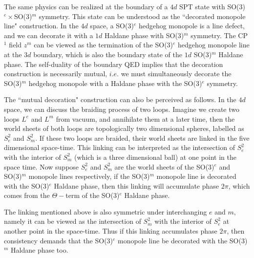 \documentclass[aps,prb,twocolumn,superscriptaddress,showpacs]{revtex4}
\begin{document}
The same physics can be realized at the boundary of a $4d$ SPT
state with SO(3)$^e \times $SO(3)$^m$ symmetry. This state can be
understood as the ``decorated monopole line" construction. In the
$4d$ space, a SO(3)$^e$ hedgehog monopole is a line defect, and we
can decorate it with a $1d$ Haldane phase with SO(3)$^m$ symmetry.
The CP$^1$ field $z^m$ can be viewed as the termination of the
SO(3)$^e$ hedgehog monopole line at the $3d$ boundary, which is
also the boundary state of the $1d$ SO(3)$^m$ Haldane phase. The
self-duality of the boundary QED implies that the decoration
construction is necessarily mutual, $i.e.$ we must simultaneously
decorate the SO(3)$^m$ hedgehog monopole with a Haldane phase with
the SO(3)$^e$ symmetry.

The ``mutual decoration" construction can also be perceived as
follows. In the $4d$ space, we can discuss the braiding process of
two loops. Imagine we create two loops $L^e$ and $L^m$ from
vacuum, and annihilate them at a later time, then the world sheets
of both loops are topologically two dimensional spheres, labelled
as $S^2_e$ and $S^2_m$. If these two loops are braided, their
world sheets are linked in the five dimensional space-time. This
linking can be interpreted as the intersection of $S^2_e$ with the
interior of $S^2_m$ (which is a three dimensional ball) at one
point in the space time. Now suppose $S^2_e$ and $S^2_m$ are the
world sheets of the SO(3)$^e$ and SO(3)$^m$ monopole lines
respectively, if the SO(3)$^m$ monopole line is decorated with the
SO(3)$^e$ Haldane phase, then this linking will accumulate phase
$2\pi$, which comes from the $\Theta-$term of the SO(3)$^e$
Haldane phase.

The linking mentioned above is also symmetric under interchanging
$e$ and $m$, namely it can be viewed as the intersection of
$S^2_m$ with the interior of $S^2_e$ at another point in the
space-time. Thus if this linking accumulates phase $2\pi$, then
consistency demands that the SO(3)$^e$ monopole line be decorated
with the SO(3)$^m$ Haldane phase too.


\end{document}
